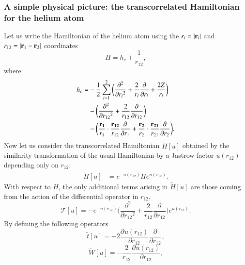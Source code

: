 \documentclass[aip,jcp,reprint,noshowkeys,superscriptaddress,twocolumn]{revtex4-1}
\newcommand{\deriv}[3]{\frac{\partial^{#3} #1}{\partial {#2}^{#3}}}
\newcommand{\bd}[1]{{\bf {#1}}}
\begin{document}
\subsubsection{A simple physical picture: the transcorrelated Hamiltonian for the helium atom}
\label{sec:he_htilde}
Let us write the Hamiltonian of the helium atom using the $r_i = |{\bf r}_i|$ and $ r_{12} = |{\bf r}_1 - {\bf r}_2 |$ coordinates\cite{Hylleraas-AdvQChem-64}  
\begin{equation}
 H  = h_c + \frac{1}{r_{12}},
\end{equation}
where 
\begin{equation}
 \begin{aligned}
 \label{def:h_c}
 h_c = &-\frac{1}{2} \sum_{i=1}^2 \bigg(\deriv{}{r_i}{2} + \frac{2}{r_i} \deriv{}{r_i}{} + \frac{2 Z}{r_i}\bigg) \\
     &-\bigg( \deriv{}{r_{12}}{2} + \frac{2}{r_{12}} \deriv{}{r_{12}}{} \bigg) \\
     &-\bigg( \frac{\bd{r_1}}{r_1} \cdot \frac{\bd{r_{12}} }{r_{12}}  \deriv{}{r_1}{} + 
                \frac{\bd{r_2}}{r_2} \cdot \frac{\bd{r_{21}} }{r_{21}}  \deriv{}{r_2}{} \bigg).
 \end{aligned}
\end{equation}
\label{sec:he_j}
Now let us consider the transcorrelated Hamiltonian $\tilde{H}[u]$ obtained by the similarity transformation of the usual Hamiltonian by a Jastrow factor $u(r_{12})$ depending only on $r_{12}$: 
\begin{equation}
 \label{eq:ht_0}
 \begin{aligned}
 \tilde{H}[u]&= e^{-u(r_{12})} H e^{u(r_{12})}.
 \end{aligned}
\end{equation}
With respect to $H$, the only additional terms arising in $\tilde{H}[u]$ are those coming from the action of the differential operator in $r_{12}$,
\begin{equation}
 \mathcal{T}[u] =  -e^{-u(r_{12})}\bigg( \deriv{}{r_{12}}{2} + \frac{2}{r_{12}} \deriv{}{r_{12}}{} \bigg)e^{u(r_{12})}.  
\end{equation}
By defining the following operators 
\begin{equation}
 \label{eq:def_tt}
 \tilde{t}[u] = -2 \deriv{u(r_{12})}{r_{12}}{} \deriv{}{r_{12}}{},
\end{equation}
\begin{equation}
 \label{eq:def_wt}
 \tilde{W}[u] = -\frac{2}{r_{12}} \deriv{u(r_{12})}{r_{12}}{}  , 
\end{equation}
\end{document}
